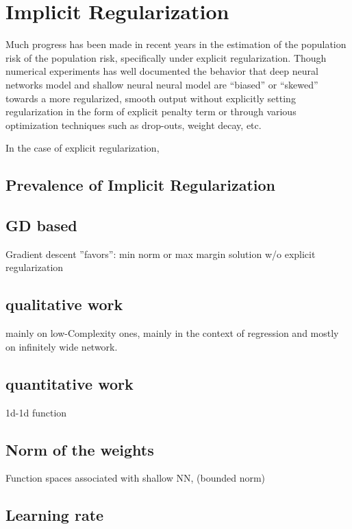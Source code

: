 \chapter{Implicit Regularization}

Much progress has been made in recent years in the estimation of the population
risk of the population risk, specifically under explicit regularization. Though
numerical experiments has well documented \TOCITE the behavior that deep neural
networks model and shallow neural neural model are ``biased'' or ``skewed''
towards a more regularized, smooth output without explicitly setting
regularization in the form of explicit penalty term or through various
optimization techniques such as drop-outs, weight decay, etc.

In the case of explicit regularization, 

\section{Prevalence of Implicit Regularization}




\section{GD based}

Gradient descent ”favors”: min norm or max margin solution w/o explicit regularization

\section{qualitative work}

mainly on low-Complexity ones, mainly in the context of regression
and mostly on infinitely wide network.

\section{quantitative work}

1d-1d function 

\section{Norm of the weights}

Function spaces associated with shallow NN, (bounded norm)

\section{Learning rate}

